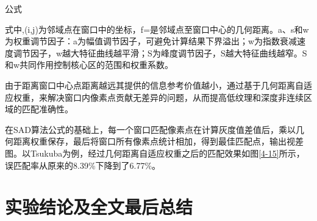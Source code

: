 {{{公式}}}

式中,(i,j)为邻域点在窗口中的坐标，f=是邻域点至窗口中心的几何距离。a、s和w为权重调节因子：a为幅值调节因子，可避免计算结果下界溢出；w为指数衰减速度调节因子，w越大特征曲线越平滑；S为峰度调节因子，S越大特征曲线越窄。S和w共同作用控制核心区的范围和权重系数。

由于距离窗口中心点距离越远其提供的信息参考价值越小，通过基于几何距离自适应权重，来解决窗口内像素点贡献无差异的问题，从而提高低纹理和深度非连续区域的匹配准确性。

在SAD算法公式的基础上，每一个窗口匹配像素点在计算灰度值差值后，乘以几何距离权重保存，最后将窗口所有像素点统计相加，得到最佳匹配点，输出视差图。以Tsukuba为例，经过几何距离自适应权重之后的匹配效果如图\ref{4-15}所示，误匹配率从原来的8.39\%下降到了6.77\%。


\section{实验结论及全文最后总结}
